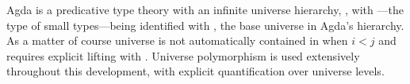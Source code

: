 Agda is a predicative type theory with an infinite universe hierarchy, , with ---the type of small types---being identified with , the base universe in Agda's hierarchy.
As a matter of course universe  is not automatically contained in  when $i < j$ and requires explicit lifting with .
Universe polymorphism is used extensively throughout this development, with explicit quantification over universe levels.

